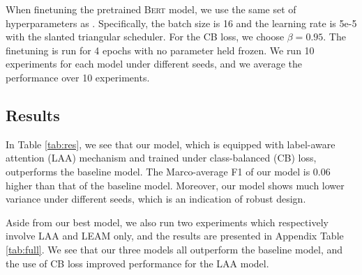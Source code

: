 When finetuning the pretrained \textsc{Bert} model, we use the same set of hyperparameters as \citet{demszky2020goemotions}. Specifically, the batch size is 16 and the learning rate is 5e-5 with the slanted triangular scheduler. For the CB loss, we choose $\beta = 0.95$. The finetuning is run for 4 epochs with no parameter held frozen. We run 10 experiments for each model under different seeds, and we average the performance over 10 experiments. 

\subsection{Results}\label{sec:res}
In Table \ref{tab:res}, we see that our model, which is equipped with label-aware attention (LAA) mechanism and trained under class-balanced (CB) loss, outperforms the baseline model. The Marco-average F1 of our model is 0.06 higher than that of the baseline model. Moreover, our model shows much lower variance under different seeds, which is an indication of robust design.


Aside from our best model, we also run two experiments which respectively involve LAA and LEAM only, and the results are presented in Appendix Table \ref{tab:full}. We see that our three models all outperform the baseline model, and the use of CB loss improved performance for the LAA model. 

